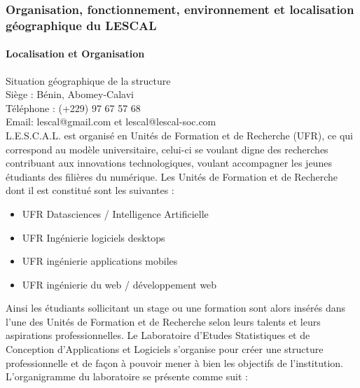\subsubsection{\texorpdfstring{Organisation, fonctionnement,
environnement et localisation\\
géographique du
LESCAL}{Organisation, fonctionnement, environnement et localisation géographique du LESCAL}}\label{organisation-fonctionnement-environnement-et-localisation-guxe9ographique-du-lescal}

\paragraph{Localisation et
Organisation}\label{localisation-et-organisation}

Situation géographique de la structure\\
Siège : Bénin, Abomey-Calavi\\
Téléphone : (+229) 97 67 57 68\\
Email: lescal@gmail.com et lescal@lescal-soc.com\\
L.E.S.C.A.L. est organisé en Unités de Formation et de Recherche (UFR),
ce qui correspond au modèle universitaire, celui-ci se voulant digne des
recherches contribuant aux innovations technologiques, voulant
accompagner les jeunes étudiants des filières du numérique. Les Unités
de Formation et de Recherche dont il est constitué sont les suivantes :

\begin{itemize}
\item
  UFR Datasciences / Intelligence Artificielle
\item
  UFR Ingénierie logiciels desktops
\item
  UFR ingénierie applications mobiles
\item
  UFR ingénierie du web / développement web
\end{itemize}

Ainsi les étudiants sollicitant un stage ou une formation sont alors
insérés dans l'une des Unités de Formation et de Recherche selon leurs
talents et leurs aspirations professionnelles. Le Laboratoire d'Etudes
Statistiques et de Conception d'Applications et Logiciels s'organise
pour créer une structure professionnelle et de façon à pouvoir mener à
bien les objectifs de l'institution. L'organigramme du laboratoire se
présente comme suit :

